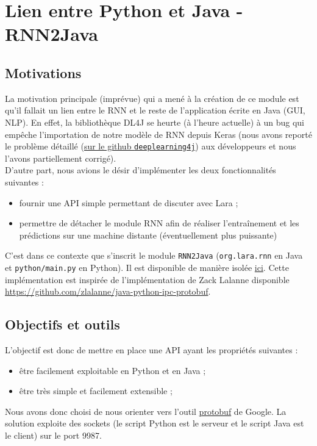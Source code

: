 \documentclass[10pt,a4paper]{article}
\newcommand\tab[1][0.5cm]{\hspace*{#1}}
\begin{document}
\section{Lien entre Python et Java - RNN2Java}
\subsection{Motivations}
La motivation principale (imprévue) qui a mené à la création de ce module est qu'il fallait un lien entre le RNN et le reste de l'application écrite en Java (GUI, NLP). En effet, la bibliothèque DL4J se heurte (à l'heure actuelle) à un bug qui empêche l'importation de notre modèle de RNN depuis Keras (nous avons reporté le problème détaillé (\href{https://github.com/eclipse/deeplearning4j/issues/8924}{sur le github \texttt{deeplearning4j}}) aux développeurs et nous l'avons partiellement corrigé). \\
\tab D'autre part, nous avions le désir d'implémenter les deux fonctionnalités suivantes :
\begin{itemize}
	\item fournir une API simple permettant de discuter avec Lara ;
	\item permettre de détacher le module RNN afin de réaliser l'entraînement et les prédictions sur une machine distante (éventuellement plus puissante)
\end{itemize}
C'est dans ce contexte que s'inscrit le module \texttt{RNN2Java} (\texttt{org.lara.rnn} en Java et \texttt{python/main.py} en Python). Il est disponible de manière isolée \href{https://github.com/LaraProject/rnn2java}{ici}. Cette implémentation est inspirée de l'implémentation de Zack Lalanne disponible \href{ici}{https://github.com/zlalanne/java-python-ipc-protobuf}.
\subsection{Objectifs et outils}
L'objectif est donc de mettre en place une API ayant les propriétés suivantes :
\begin{itemize}
	\item être facilement exploitable en Python et en Java ;
	\item être très simple et facilement extensible ;
\end{itemize}
Nous avons donc choisi de nous orienter vers l'outil \href{https://developers.google.com/protocol-buffers}{protobuf} de Google. La solution exploite des sockets (le script Python est le serveur et le script Java est le client) sur le port 9987.
\end{document}
